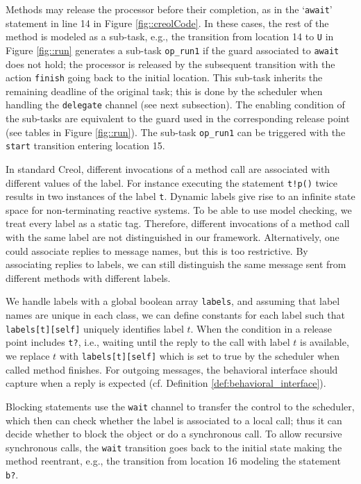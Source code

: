 \documentclass[copyright,creativecommons]{eptcs}
\theoremstyle{definition}
\begin{document}
Methods may  release the processor before their completion, as in the `\lstinline{await}' statement in line 14 in Figure \ref{fig::creolCode}.
In these cases, the rest of the method is modeled as a sub-task, e.g., the  transition from location 14 to \verb"U" in Figure \ref{fig::run} generates a sub-task \lstinline{op_run1} if the guard associated to \lstinline{await} does not hold; the processor is released by the subsequent transition with the action \lstinline{finish} going back to the initial location.
This sub-task inherits the remaining deadline of the original task; this is done by the scheduler when handling the \lstinline{delegate} channel (see next subsection).
The enabling condition of the sub-tasks are equivalent to the guard used in the corresponding release point (see tables in Figure \ref{fig::run}).
The sub-task \lstinline{op_run1} can be triggered with the \lstinline{start} transition entering location 15.


In standard Creol, different invocations of a method call are associated with different values of the label. For instance executing the statement \lstinline$t!p()$ twice results in two  instances of the label \lstinline $t$. Dynamic labels give rise to an infinite state space for  non-terminating reactive systems.
To be able to use model checking, we treat every label as a static tag. Therefore, different invocations of a method call with the same label are not distinguished in our framework.
Alternatively, one could associate replies to message names, but this is too restrictive.
By associating replies to labels, we can still distinguish the same message sent from different methods with different labels.

We handle labels with a global boolean array \lstinline{labels}, and assuming that label names are unique in each class, we can define constants for each label such that \lstinline{labels[t][self]} uniquely identifies label $t$.
When the condition in a release point includes \lstinline$t?$, i.e., waiting until the reply to the call with label $t$ is available, we replace $t$ with \lstinline{labels[t][self]} which is set to true by the scheduler when called method finishes.
For outgoing messages, the behavioral interface should capture when a reply is expected (cf. Definition \ref{def:behavioral_interface}).


Blocking statements use the \lstinline{wait} channel to transfer the control to the scheduler, which then can check whether the label is associated to a local call; thus it can decide whether to block the object or do a synchronous call.
To allow recursive synchronous calls, the \lstinline{wait} transition goes back to the initial state making the method reentrant, e.g., the transition from location 16 modeling the statement \lstinline{b?}.
\end{document}

